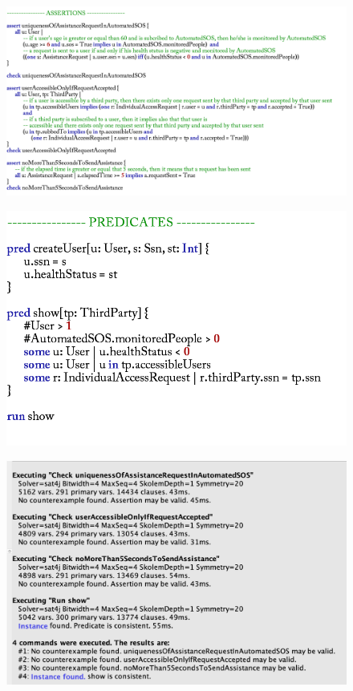 \documentclass[12pt,a4paper]{article}
\begin{document}
	\begin{figure}[H]
		\centering
		\includegraphics[width=1.3\linewidth]{Images/assertions}
		\label{fig:assertions}
	\end{figure}
	\begin{figure}[H]
		\centering
		\includegraphics[width=0.7\linewidth]{Images/predicates}
		\label{fig:predicates}
	\end{figure}
	\begin{figure}[H]
		\centering
		\includegraphics[width=1.2\linewidth]{Images/alloy-consistency}
		\label{fig:alloy-consistency}
	\end{figure}
	\newpage
\end{document}
